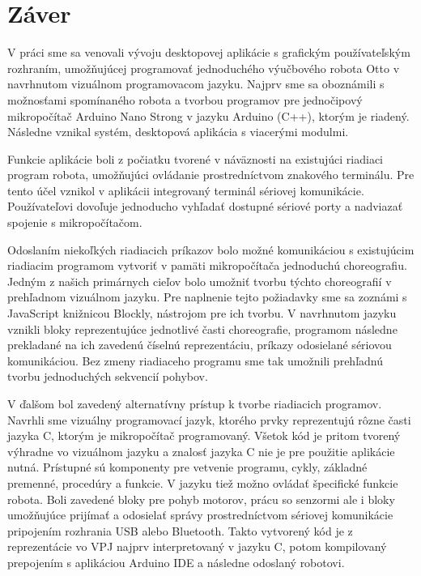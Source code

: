 \chapter*{Záver}  %

V práci sme sa venovali vývoju desktopovej aplikácie s grafickým používateľským rozhraním, umožňujúcej programovať jednoduchého výučbového robota Otto  v navrhnutom vizuálnom programovacom jazyku. Najprv sme sa oboznámili s možnosťami spomínaného robota a tvorbou programov pre jednočipový mikropočítač Arduino Nano Strong v jazyku Arduino (C++), ktorým je riadený. Následne vznikal systém, desktopová aplikácia s viacerými modulmi.

Funkcie aplikácie boli z počiatku tvorené v náväznosti na existujúci riadiaci program robota, umožňujúci ovládanie prostredníctvom znakového terminálu. Pre tento účel vznikol v aplikácii integrovaný terminál sériovej komunikácie. Používateľovi dovoľuje jednoducho vyhľadať dostupné sériové porty a nadviazať spojenie s mikropočítačom.

Odoslaním niekoľkých riadiacich príkazov bolo možné komunikáciou s existujúcim riadiacim programom vytvoriť v pamäti mikropočítača jednoduchú choreografiu. Jedným z našich primárnych cieľov bolo umožniť tvorbu týchto choreografií v prehľadnom vizuálnom jazyku. Pre naplnenie tejto požiadavky sme sa zoznámi s JavaScript knižnicou Blockly, nástrojom pre ich tvorbu. V navrhnutom jazyku vznikli bloky reprezentujúce jednotlivé časti choreografie, programom následne prekladané na ich zavedenú číselnú reprezentáciu, príkazy odosielané sériovou komunikáciou. Bez zmeny riadiaceho programu sme tak umožnili prehľadnú tvorbu jednoduchých sekvencií pohybov.

V ďalšom bol zavedený alternatívny prístup k tvorbe riadiacich programov. Navrhli sme vizuálny programovací jazyk, ktorého prvky reprezentujú rôzne časti jazyka C, ktorým je mikropočítač programovaný. Všetok kód je pritom tvorený výhradne vo vizuálnom jazyku a znalosť jazyka C nie je pre použitie aplikácie nutná. Prístupné sú komponenty pre vetvenie programu, cykly, základné premenné, procedúry a funkcie. V jazyku tiež možno ovládať špecifické funkcie robota. Boli zavedené bloky pre pohyb motorov, prácu so senzormi ale i bloky umožňujúce prijímať a odosielať správy prostredníctvom sériovej komunikácie pripojením rozhrania USB alebo Bluetooth. Takto vytvorený kód je z reprezentácie vo VPJ najprv interpretovaný v jazyku C, potom kompilovaný prepojením s aplikáciou Arduino IDE a následne odoslaný robotovi.

